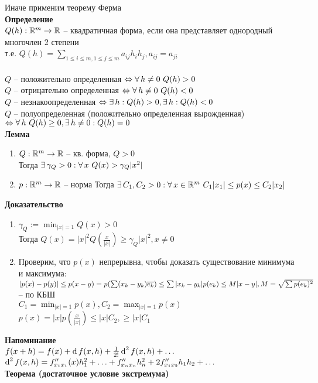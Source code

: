 \documentclass[12pt]{article}
\begin{document}
Иначе применим теорему Ферма\\
\textbf{Определение}\\
$Q(h): \mathbb{R}^m \rightarrow \mathbb{R}$ -- квадратичная форма, если она представляет однородный многочлен 2 степени\\
т.е. $Q(h) = \sum_{1 \leq i \leq m, 1 \leq j \leq m} a_{ij}h_i h_j, a_{ij} = a_{ji}$\\\\
$Q$ -- положительно определенная $\Leftrightarrow \forall\, h \neq 0\ Q(h) > 0$\\
$Q$ -- отрицательно определенная $\Leftrightarrow \forall\, h \neq 0\ Q(h) < 0$\\
$Q$ -- незнакоопределенная $\Leftrightarrow \exists\, h: Q(h) > 0, \exists\, h: Q(h) < 0$\\
$Q$ -- полуопределенная (положительно определенная вырожденная) $\Leftrightarrow \forall\, h\ Q(h) \geq 0, \exists\, h \neq 0: Q(h) = 0$\\
\textbf{Лемма}
\begin{enumerate}
    \item $Q: \mathbb{R}^m \rightarrow \mathbb{R}$ -- кв. форма, $Q > 0$\\
    Тогда $\exists\, \gamma_Q > 0: \forall\, x\ Q(x) > \gamma_Q|x^2|$
    \item $p: \mathbb{R}^m \rightarrow \mathbb{R}$ -- норма
    Тогда $\exists\, C_1, C_2 > 0: \forall\, x \in \mathbb{R}^m\ C_1|x_1| \leq p(x) \leq C_2|x_2|$
\end{enumerate}
\textbf{Доказательство}
\begin{enumerate}
    \item $\gamma_Q:= \min_{|x|=1} Q(x) > 0$\\
    Тогда $Q(x) = |x|^2Q(\frac x{|x|}) \geq \gamma_Q |x|^2, x \neq 0$
    \item Проверим, что $p(x)$ непрерывна, чтобы доказать существование минимума и максимума:\\
    $|p(x) - p(y)| \leq p(x-y) = p(\sum (x_k-y_k) \overline{e_k}) \leq \sum |x_k - y_k| p(e_k) \leq M|x-y|, M = \sqrt{\sum p(e_k)^2}$ -- по КБШ\\
    $C_1 = \min_{|x|=1}p(x), C_2 = \max_{|x|=1}p(x)$\\
    $p(x) = |x|p(\frac x{|x|}) \leq |x|C_2, \geq |x|C_1$
\end{enumerate}
\textbf{Напоминание}\\
$f(x+h) = f(x) + \operatorname{d} f(x, h) + \frac1{2!}\operatorname{d}^2 f(x,h) + \ldots$\\
$\operatorname{d}^2 f(x,h) = f''_{x_1x_1}(x) h_1^2 + \ldots + f''_{x_nx_n}h_n^2 + 2f''_{x_1x_2}h_1h_2 + \ldots$\\
\textbf{Теорема (достаточное условие экстремума)}\\
\end{document}
